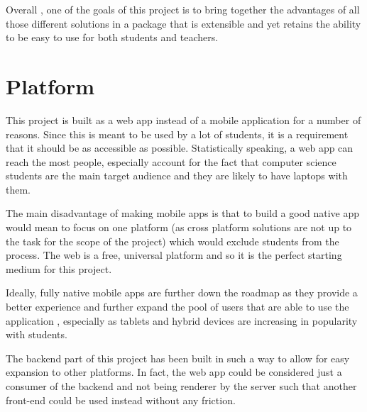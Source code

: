 Overall , one of the goals of this project is to bring together the advantages of all those different solutions in a package that is extensible and yet retains the ability to be easy to use for both students and teachers.


\section{Platform}
This project is built as a web app instead of a mobile application for a number of reasons. Since this is meant to be used by a lot of students, it is a requirement that it should be as accessible as possible. Statistically speaking, a web app can reach the most people, especially account for the fact that computer science students are the main target audience and they are likely to have laptops with them.

The main disadvantage of making mobile apps is that to build a good native app would mean to focus on one platform (as cross platform solutions are not up to the task for the scope of the project) which would exclude students from the process. The web is a free, universal platform and so it is the perfect starting medium for this project.

Ideally, fully native mobile apps are further down the roadmap as they provide a better experience and further expand the pool of users that are able to use the application , especially as tablets and hybrid devices are increasing in popularity with students\cite{tablets}.

The backend part of this project has been built in such a way to allow for easy expansion to other platforms. In fact, the web app could be considered just a consumer of the backend and not being renderer by the server such that another front-end could be used instead without any friction.
















